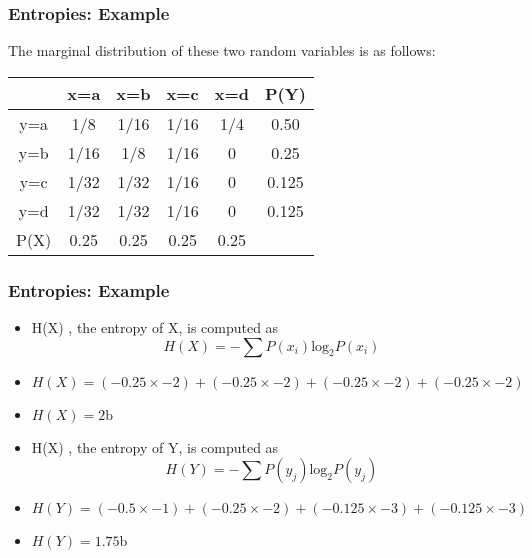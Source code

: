 \documentclass[a4]{beamer}
\begin{document}
\frametitle{Entropies: Example}
The marginal distribution of these two random variables is as follows:\\ \bigskip
\begin{center}
\begin{tabular}{|c|c|c|c|c||c|}
\hline
&x=a& x=b & x=c & x=d &\alert{P(Y)}\\ \hline
y=a &1/8 &1/16 &1/16 &1/4 & \alert{0.50}\\ \hline
y=b &1/16 & 1/8& 1/16& 0 & \alert{0.25}\\ \hline
y=c & 1/32&1/32 & 1/16 & 0& \alert{0.125}\\ \hline
y=d & 1/32& 1/32& 1/16 & 0& \alert{0.125}\\ \hline \hline
\alert{P(X)} & \alert{0.25}& \alert{0.25}& \alert{0.25} & \alert{0.25}&\\ \hline
\end{tabular}
\end{center}




\frametitle{Entropies: Example}
\begin{itemize}

\item H(X) , the entropy of X, is computed as\\
 \[H(X) = -\sum P(x_i) \mbox{log}_2P(x_i)\] \item $H(X) =  (-0.25 \times -2) + (-0.25 \times -2) +(-0.25 \times -2) +(-0.25 \times -2)$\item $ H(X) = 2 \mbox{b}$ \bigskip

\item H(X) , the entropy of Y, is computed as\\
 \[H(Y) = -\sum P(y_j) \mbox{log}_2P(y_j)\] \item $H(Y) =  (-0.5 \times -1) +(-0.25 \times -2)  + (-0.125 \times -3)  +(-0.125 \times -3)$\item $ H(Y) = 1.75 \mbox{b}$


\end{itemize}
\end{document}
